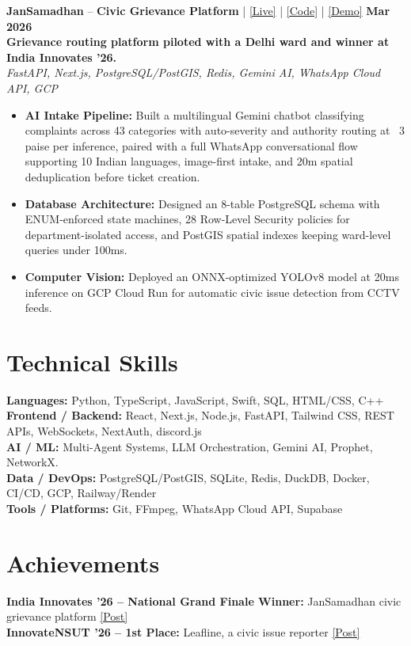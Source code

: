 \documentclass[a4paper,9pt]{extarticle}
\newenvironment{cvlist}{%
  \begin{itemize}[nosep, leftmargin=1.2em, itemsep=0.5pt, topsep=1pt, label=\textbullet, after=\vspace{2pt}]
}{%
  \end{itemize}
}
\begin{document}
\noindent\textbf{JanSamadhan} -- \textbf{Civic Grievance Platform} | \href{https://jansamadhan.perkkk.dev}{\small [Live]} | \href{https://github.com/Prakharrdev/ps-crmdev1}{\small [Code]} | \href{https://youtu.be/JvkJd1MAV3M}{\small [Demo]} \hfill \textbf{Mar 2026}\\[1pt]
\textbf{Grievance routing platform piloted with a Delhi ward and winner at India Innovates '26.}\\[1pt]
\noindent\textit{FastAPI, Next.js, PostgreSQL/PostGIS, Redis, Gemini AI, WhatsApp Cloud API, GCP}
\begin{cvlist}
  \item \textbf{AI Intake Pipeline:} Built a multilingual Gemini chatbot classifying complaints across 43 categories with auto-severity and authority routing at ~3 paise per inference, paired with a full WhatsApp conversational flow supporting 10 Indian languages, image-first intake, and 20m spatial deduplication before ticket creation.
  \item \textbf{Database Architecture:} Designed an 8-table PostgreSQL schema with ENUM-enforced state machines, 28 Row-Level Security policies for department-isolated access, and PostGIS spatial indexes keeping ward-level queries under 100ms.
  \item \textbf{Computer Vision:} Deployed an ONNX-optimized YOLOv8 model at 20ms inference on GCP Cloud Run for automatic civic issue detection from CCTV feeds.
\end{cvlist}

\section{Technical Skills} 
\noindent\textbf{Languages:} Python, TypeScript, JavaScript, Swift, SQL, HTML/CSS, C++  \\[1pt]
\noindent\textbf{Frontend / Backend:} React, Next.js, Node.js, FastAPI, Tailwind CSS, REST APIs, WebSockets, NextAuth, discord.js \\[1pt]
\noindent\textbf{AI / ML:} Multi-Agent Systems, LLM Orchestration, Gemini AI, Prophet, NetworkX. \\[1pt]
\noindent\textbf{Data / DevOps:} PostgreSQL/PostGIS, SQLite, Redis, DuckDB, Docker, CI/CD, GCP, Railway/Render \\[1pt]
\noindent\textbf{Tools / Platforms:} Git, FFmpeg, WhatsApp Cloud API, Supabase

\section{Achievements}
\noindent\textbf{India Innovates '26 -- National Grand Finale Winner:} JanSamadhan civic grievance platform \hfill \href{https://www.linkedin.com/posts/manipal-university-jaipur_manipaluniversityjaipur-indiainnovates2026-ugcPost-7450213112731049984-a94A}{\small [Post]}\\[1pt]
\noindent\textbf{InnovateNSUT '26 -- 1st Place:} Leafline, a civic issue reporter \hfill \href{https://www.linkedin.com/posts/prakharrdev_hackathon-civictech-fullstackdevelopment-activity-7424364658448363521-RG4Y}{\small [Post]}
\end{document}
